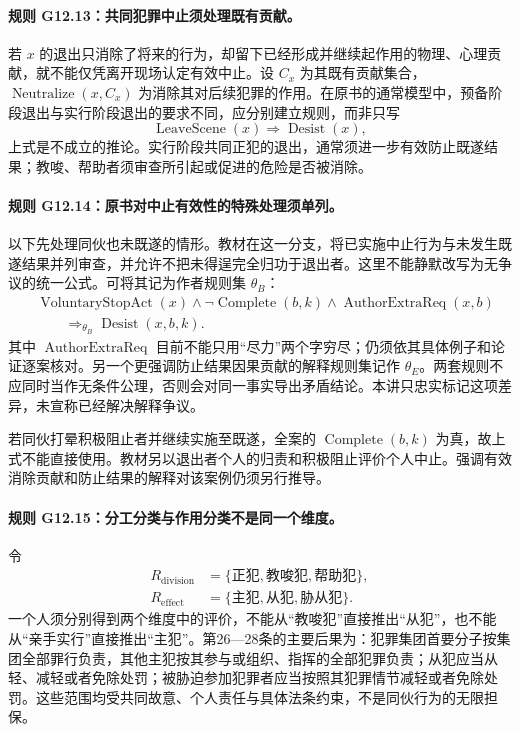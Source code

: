 \paragraph{规则 G12.13：共同犯罪中止须处理既有贡献。}
若 $x$ 的退出只消除了将来的行为，却留下已经形成并继续起作用的物理、心理贡献，就不能仅凭离开现场认定有效中止。设 $C_x$ 为其既有贡献集合，$\operatorname{Neutralize}(x,C_x)$ 为消除其对后续犯罪的作用。在原书的通常模型中，预备阶段退出与实行阶段退出的要求不同，应分别建立规则，而非只写
\[
\operatorname{LeaveScene}(x)\Longrightarrow\operatorname{Desist}(x),
\]
上式是不成立的推论。实行阶段共同正犯的退出，通常须进一步有效防止既遂结果；教唆、帮助者须审查所引起或促进的危险是否被消除。

\paragraph{规则 G12.14：原书对中止有效性的特殊处理须单列。}
以下先处理同伙也未既遂的情形。教材在这一分支，将已实施中止行为与未发生既遂结果并列审查，并允许不把未得逞完全归功于退出者。这里不能静默改写为无争议的统一公式。可将其记为作者规则集 $\theta_B$：
\[
\begin{aligned}
&\operatorname{VoluntaryStopAct}(x)\land\neg\operatorname{Complete}(b,k)
\land\operatorname{AuthorExtraReq}(x,b)\\
&\qquad\Longrightarrow_{\theta_B}\operatorname{Desist}(x,b,k).
\end{aligned}
\]
其中 $\operatorname{AuthorExtraReq}$ 目前不能只用“尽力”两个字穷尽；仍须依其具体例子和论证逐案核对。另一个更强调防止结果因果贡献的解释规则集记作 $\theta_E$。两套规则不应同时当作无条件公理，否则会对同一事实导出矛盾结论。本讲只忠实标记这项差异，未宣称已经解决解释争议。

若同伙打晕积极阻止者并继续实施至既遂，全案的 $\operatorname{Complete}(b,k)$ 为真，故上式不能直接使用。教材另以退出者个人的归责和积极阻止评价个人中止。强调有效消除贡献和防止结果的解释对该案例仍须另行推导。

\paragraph{规则 G12.15：分工分类与作用分类不是同一个维度。}
令
\[
\begin{aligned}
R_{\mathrm{division}}&=\{\text{正犯},\text{教唆犯},\text{帮助犯}\},\\
R_{\mathrm{effect}}&=\{\text{主犯},\text{从犯},\text{胁从犯}\}.
\end{aligned}
\]
一个人须分别得到两个维度中的评价，不能从“教唆犯”直接推出“从犯”，也不能从“亲手实行”直接推出“主犯”。第26—28条的主要后果为：犯罪集团首要分子按集团全部罪行负责，其他主犯按其参与或组织、指挥的全部犯罪负责；从犯应当从轻、减轻或者免除处罚；被胁迫参加犯罪者应当按照其犯罪情节减轻或者免除处罚。这些范围均受共同故意、个人责任与具体法条约束，不是同伙行为的无限担保。

